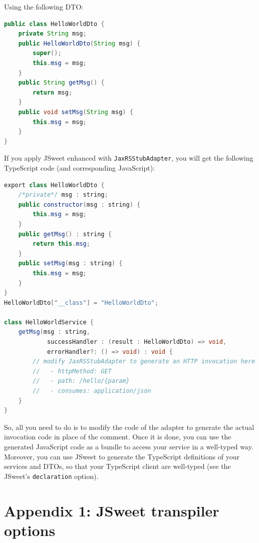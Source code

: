 \documentclass[a4paper]{report}
\begin{document}
\noindent
Using the following DTO:

\begin{lstlisting}[language=Java]
public class HelloWorldDto {
	private String msg;
	public HelloWorldDto(String msg) {
		super();
		this.msg = msg;
	}
	public String getMsg() {
		return msg;
	}
	public void setMsg(String msg) {
		this.msg = msg;
	}
}
\end{lstlisting}

\noindent
If you apply JSweet enhanced with \texttt{JaxRSStubAdapter}, you will get the following TypeScript code (and corresponding JavaScript):

\begin{lstlisting}[language=Java]
export class HelloWorldDto {
	/*private*/ msg : string;
	public constructor(msg : string) {
		this.msg = msg;
	}
	public getMsg() : string {
		return this.msg;
	}
	public setMsg(msg : string) {
		this.msg = msg;
	}
}
HelloWorldDto["__class"] = "HelloWorldDto";

class HelloWorldService {
	getMsg(msg : string, 
			successHandler : (result : HelloWorldDto) => void, 
			errorHandler?: () => void) : void {
		// modify JaxRSStubAdapter to generate an HTTP invocation here
		//   - httpMethod: GET
		//   - path: /hello/{param}
		//   - consumes: application/json
	}
}
\end{lstlisting}

\noindent
So, all you need to do is to modify the code of the adapter to generate the actual invocation code in place of the comment. Once it is done, you can use the generated JavaScript code as a bundle to access your service in a well-typed way. Moreover, you can use JSweet to generate the TypeScript definitions of your services and DTOs, so that your TypeScript client are well-typed (see the JSweet's \texttt{declaration} option).

\chapter*{Appendix 1: JSweet transpiler options}
\end{document}
